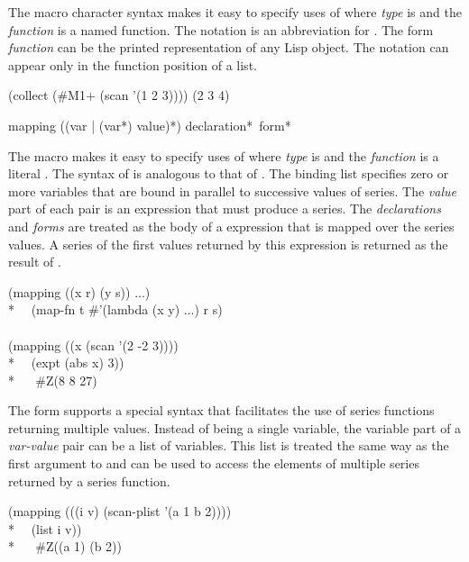 \begin{defun}[Function]
The \cd{\#} macro character syntax  makes it easy to specify uses of 
where {\it type} is  and the {\it function} is a named
function.  The notation  is an
abbreviation for .  The form {\it function} can
be the printed representation of any Lisp object.  The notation
 can appear only in the
function position of a list.
\begin{lisp}
(collect (\#M1+ (scan '(1 2 3)))) {\EV} (2 3 4)
\end{lisp}
\end{defun}

\begin{defmac}
mapping ({({var | ({var}*)} value)}*) {declaration}* {\,form}*

The macro  makes it easy to specify uses of 
where {\it type} is  and the {\it function} is a literal 
.  The syntax of  is analogous to that of .
The binding list specifies zero or more variables that are bound in parallel to
successive values of series.  The {\it value} part of each pair is
an expression that must produce a
series.  The {\it declarations} and {\it forms} are
treated as the body of a  expression
that is mapped over the series values.  A series of the first values
returned by this  expression is returned as the result of 
.
\begin{lisp}
(mapping ((x r) (y s)) ...) {\EQ} \\*
~~(map-fn t \#'(lambda (x y) ...) r s) \\
\\
(mapping ((x (scan '(2 -2 3)))) \\*
~~(expt (abs x) 3)) \\*
~~{\EV} \#Z(8 8 27)
\end{lisp}

The form  supports a special syntax that facilitates the
use of series functions returning multiple values.  Instead of being
a single variable, the variable part of a {\it var-value} pair can be a list of
variables.  This list is treated the same way as the first argument to
 and can be used to access the elements of
multiple series returned by a series function.
\begin{lisp}
(mapping (((i v) (scan-plist '(a 1 b 2)))) \\*
~~(list i v)) \\*
~~{\EV} \#Z((a 1) (b 2))
\end{lisp}
\end{defmac}


